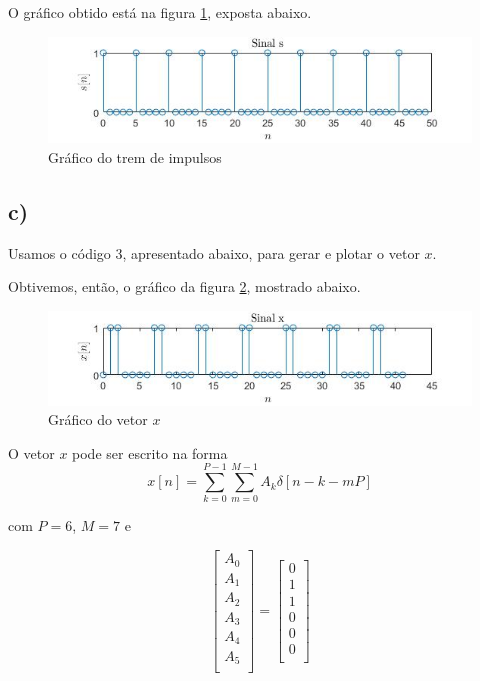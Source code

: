 \documentclass[a4paper, 12pt]{article}
\begin{document}


O gráfico obtido está na figura \ref{fig:1b}, exposta abaixo.
\begin{figure}[H]
	\centering
	\includegraphics[scale=0.7]{../Imagens/ex1/b.jpg}  
	\caption{Gráfico do trem de impulsos}
	\label{fig:1b}
\end{figure}

\subsection{c)}

Usamos o código 3, apresentado abaixo, para gerar e plotar o vetor $x$.

\newpage



Obtivemos, então, o gráfico da figura \ref{fig:1c}, mostrado abaixo.

\begin{figure}[H]
	\centering
	\includegraphics[scale=0.7]{../Imagens/ex1/c.jpg}  
	\caption{Gráfico do vetor $x$}
	\label{fig:1c}
\end{figure}

O vetor $x$ pode ser escrito na forma $$ x[n] = \sum_{k=0}^{P-1}\sum_{m=0}^{M-1} A_k\delta[n-k-mP] $$

com $P=6$, $M=7$ e 

\[
\begin{bmatrix}
   	A_0\\
    A_1\\
    A_2\\
    A_3\\
    A_4\\
    A_5\\
    
\end{bmatrix}
=
\begin{bmatrix}
    0\\
    1\\
    1\\
    0\\
    0\\
    0\\
\end{bmatrix}
\]
\end{document}
